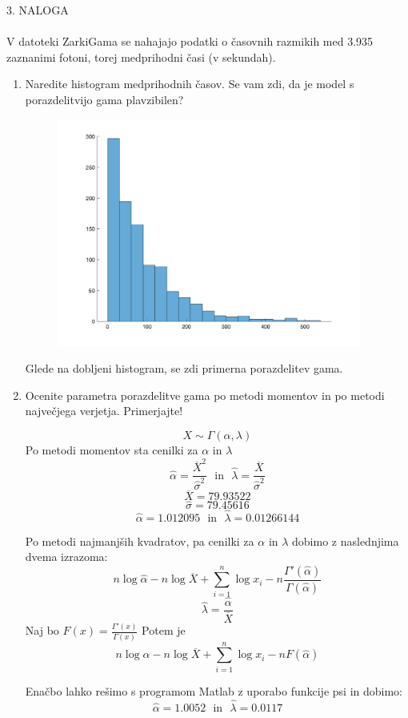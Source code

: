 \documentclass[a4paper]{article}
\begin{document}
\large{3. NALOGA} \\ \\
V datoteki ZarkiGama se nahajajo podatki o časovnih razmikih med 3.935 zaznanimi fotoni, torej medprihodni časi (v sekundah).
\begin{enumerate}[label=(\alph*)]
\item Naredite histogram medprihodnih časov. Se vam zdi, da je model s porazdelitvijo gama plavzibilen?
\begin{figure}[h!]
\centering
\includegraphics[width=10cm]{histogram3.png}
\label{Histogram medprehodnih časov}
\end{figure}

Glede na dobljeni histogram, se zdi primerna porazdelitev gama.

\item Ocenite parametra porazdelitve gama po metodi momentov in po metodi največjega verjetja. Primerjajte!

$$X  \sim \Gamma(\alpha, \lambda)$$
Po metodi momentov sta cenilki za $\alpha$ in $\lambda$
$$\hat{\alpha} = \frac{\overline{X}^2}{\hat{\sigma}^2} \ \ \ \text{in} \ \ \ \hat{\lambda} = \frac{\overline{X}}{\hat{\sigma}^2} $$
$$\overline{X} = 79.93522$$
$$\hat{\sigma} = 79.45616$$
$$\hat{\alpha} = 1.012095 \ \ \  \text{in} \ \ \ \hat{\lambda} = 0.01266144 $$

Po metodi najmanjših kvadratov, pa cenilki za $\alpha$ in $\lambda$ dobimo z naslednjima dvema izrazoma:
$$n\log{\hat{\alpha}} - n\log{\overline{X}} + \sum_{i=1}^{n} \log{x_i} - n\frac{\Gamma'(\hat{\alpha})}{\Gamma(\hat{\alpha})}$$
$$\hat{\lambda} = \frac{\hat{\alpha}}{\overline{X}}$$
Naj bo $F(x) = \frac{\Gamma'(x)}{\Gamma(x)}$
Potem je 
$$n\log{\hat{\alpha}} - n\log{\overline{X}} + \sum_{i=1}^{n} \log{x_i} - nF(\hat{\alpha})$$

Enačbo lahko rešimo s programom Matlab z uporabo funkcije psi in dobimo:
$$\hat{\alpha} = 1.0052 \ \ \ \text{in} \ \ \ \hat{\lambda} = 0.0117$$


\end{enumerate}
\end{document}
